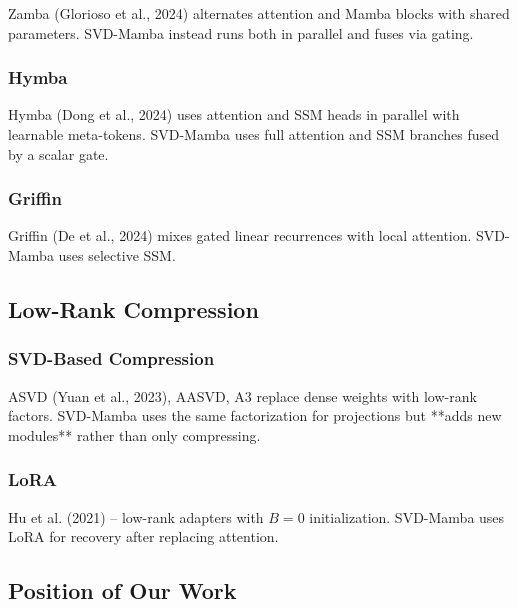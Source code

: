 Zamba (Glorioso et al., 2024) alternates attention and Mamba blocks with 
shared parameters. SVD-Mamba instead runs both in parallel and fuses via 
gating.

\subsubsection{Hymba}

Hymba (Dong et al., 2024) uses attention and SSM heads in parallel with 
learnable meta-tokens. SVD-Mamba uses full attention and SSM branches 
fused by a scalar gate.

\subsubsection{Griffin}

Griffin (De et al., 2024) mixes gated linear recurrences with local 
attention. SVD-Mamba uses selective SSM.

\subsection{Low-Rank Compression}

\subsubsection{SVD-Based Compression}

ASVD (Yuan et al., 2023), AASVD, A3 replace dense weights with low-rank 
factors. SVD-Mamba uses the same factorization for projections but **adds 
new modules** rather than only compressing.

\subsubsection{LoRA}

Hu et al. (2021) -- low-rank adapters with $B=0$ initialization. SVD-Mamba 
uses LoRA for recovery after replacing attention.

\subsection{Position of Our Work}

